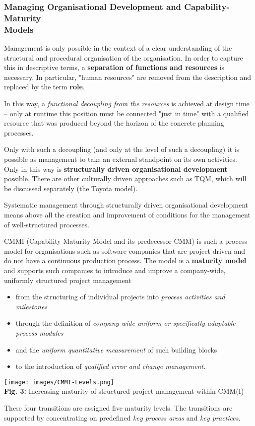 \documentclass[11pt,a4paper]{article}
\begin{document}
\subsubsection{Managing Organisational Development and Capability-Maturity\\
  Models} 

Management is only possible in the context of a clear understanding of the
structural and procedural organisation of the organisation.  In order to
capture this in descriptive terms, a \textbf{separation of functions and
  resources} is necessary. In particular, "human resources" are removed from
the description and replaced by the term \textbf{role}.

In this way, a \emph{functional decoupling from the resources} is achieved at
design time -- only at runtime this position must be connected "just in time"
with a qualified resource that was produced beyond the horizon of the concrete
planning processes.

Only with such a decoupling (and only at the level of such a decoupling) it is
possible as management to take an external standpoint on its own activities.
Only in this way is \textbf{structurally driven organisational development}
possible. There are other culturally driven approaches such as TQM, which will
be discussed separately (the Toyota model).

Systematic management through structurally driven organisational development
means above all the creation and improvement of conditions for the management
of well-structured processes.

CMMI (Capability Maturity Model and its predecessor CMM) is such a process
model for organisations such as software companies that are project-driven and
do not have a continuous production process. The model is a \textbf{maturity
  model} and supports such companies to introduce and improve a company-wide,
uniformly structured project management
\begin{itemize} 
\item from the structuring of individual projects into \emph{process
  activities and milestones}
\item through the definition of \emph{company-wide uniform or specifically
  adaptable process modules}
\item and the \emph{uniform quantitative measurement} of such building blocks
\item to the introduction of \emph{qualified error and change management}.
\end{itemize}
\begin{center}
  \texttt{[image: images/CMMI-Levels.png]}\\
  \textbf{Fig. 3:} Increasing maturity of structured project management within
  CMM(I)
\end{center}
These four transitions are assigned five maturity levels. The transitions are
supported by concentrating on predefined \emph{key process areas} and
\emph{key practices}.
\end{document}
